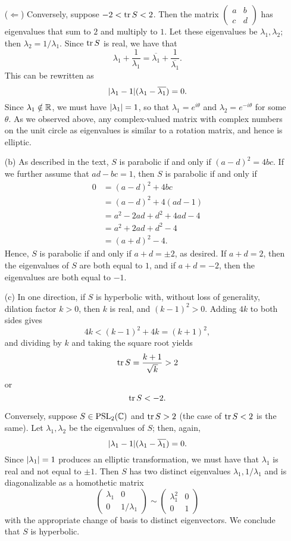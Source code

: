 \begin{exercise}
\begin{sol}
\begin{enumerate}
			($\Leftarrow$) Conversely, suppose $-2<\operatorname{tr} S<2$. Then the matrix $\begin{pmatrix} a & b \\ c & d \end{pmatrix}$ has eigenvalues that sum to $2$ and multiply to $1$. Let these eigenvalues be $\lambda_1,\lambda_2$; then $\lambda_2=1/\lambda_1$. Since $\operatorname{tr} S$ is real, we have that $$\lambda_1+\dfrac{1}{\lambda_1}=\overline{\lambda_1}+\dfrac{1}{\overline{\lambda_1}}.$$ This can be rewritten as $$\lvert \lambda_1-1 \rvert(\lambda_1-\overline{\lambda_1})=0.$$ Since $\lambda_1 \notin \mathbb R$, we must have $\lvert \lambda_1 \rvert=1$, so that $\lambda_1=e^{i \theta}$ and $\lambda_2=e^{-i \theta}$ for some $\theta$. As we observed above, any complex-valued matrix with complex numbers on the unit circle as eigenvalues is similar to a rotation matrix, and hence is elliptic.

		\item[(b)] As described in the text, $S$ is parabolic if and only if $(a-d)^2=4bc$. If we further assume that $ad-bc=1$, then $S$ is parabolic if and only if
		\begin{align*}
			0 &=(a-d)^2+4bc \\
			&=(a-d)^2+4(ad-1) \\
			&=a^2-2ad+d^2+4ad-4 \\
			&=a^2+2ad+d^2-4 \\
			&=(a+d)^2-4.
		\end{align*}
		Hence, $S$ is parabolic if and only if $a+d=\pm 2$, as desired. If $a+d=2$, then the eigenvalues of $S$ are both equal to $1$, and if $a+d=-2$, then the eigenvalues are both equal to $-1$.

		\item[(c)] In one direction, if $S$ is hyperbolic with, without loss of generality, dilation factor $k>0$, then $k$ is real, and $(k-1)^2>0$. Adding $4k$ to both sides gives $$4k<(k-1)^2+4k=(k+1)^2,$$ and dividing by $k$ and taking the square root yields $$\operatorname{tr} S=\dfrac{k+1}{\sqrt{k}}>2$$ or $$\operatorname{tr} S<-2.$$
		
		Conversely, suppose $S \in \text{PSL}_2(\mathbb C)$ and $\operatorname{tr} S>2$ (the case of $\operatorname{tr} S<2$ is the same). Let $\lambda_1,\lambda_2$ be the eigenvalues of $S$; then, again, $$\lvert \lambda_1-1 \rvert(\lambda_1-\overline{\lambda_1})=0.$$ Since $\lvert \lambda_1 \rvert=1$ produces an elliptic transformation, we must have that $\lambda_1$ is real and not equal to $\pm 1$. Then $S$ has two distinct eigenvalues $\lambda_1,1/\lambda_1$ and is diagonalizable as a homothetic matrix $$\begin{pmatrix} \lambda_1 & 0 \\
		0 & 1/\lambda_1 \end{pmatrix} \sim \begin{pmatrix}
		\lambda_1^2 & 0 \\
		0 & 1
		\end{pmatrix}$$ with the appropriate change of basis to distinct eigenvectors. We conclude that $S$ is hyperbolic. \qedsymbol
	\end{enumerate}	
	\end{sol}
\end{exercise}
